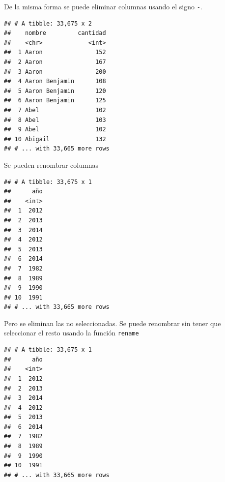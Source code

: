 \documentclass[]{book}
\newenvironment{Shaded}{\begin{snugshade}}{\end{snugshade}}
\newcommand{\DataTypeTok}[1]{\textcolor[rgb]{0.13,0.29,0.53}{#1}}
\newcommand{\KeywordTok}[1]{\textcolor[rgb]{0.13,0.29,0.53}{\textbf{#1}}}
\newcommand{\NormalTok}[1]{#1}
\newcommand{\OperatorTok}[1]{\textcolor[rgb]{0.81,0.36,0.00}{\textbf{#1}}}
\newcommand{\StringTok}[1]{\textcolor[rgb]{0.31,0.60,0.02}{#1}}
\theoremstyle{definition}
\theoremstyle{definition}
\theoremstyle{definition}
\theoremstyle{remark}
\begin{document}
De la misma forma se puede eliminar columnas usando el signo \texttt{-}.

\begin{Shaded}
\end{Shaded}

\begin{verbatim}
## # A tibble: 33,675 x 2
##    nombre         cantidad
##    <chr>             <int>
##  1 Aaron               152
##  2 Aaron               167
##  3 Aaron               200
##  4 Aaron Benjamin      108
##  5 Aaron Benjamin      120
##  6 Aaron Benjamin      125
##  7 Abel                102
##  8 Abel                103
##  9 Abel                102
## 10 Abigail             132
## # ... with 33,665 more rows
\end{verbatim}

Se pueden renombrar columnas

\begin{Shaded}
\end{Shaded}

\begin{verbatim}
## # A tibble: 33,675 x 1
##      año
##    <int>
##  1  2012
##  2  2013
##  3  2014
##  4  2012
##  5  2013
##  6  2014
##  7  1982
##  8  1989
##  9  1990
## 10  1991
## # ... with 33,665 more rows
\end{verbatim}

Pero se eliminan las no seleccionadas. Se puede renombrar sin tener que
seleccionar el resto usando la función \texttt{rename}

\begin{Shaded}
\end{Shaded}

\begin{verbatim}
## # A tibble: 33,675 x 1
##      año
##    <int>
##  1  2012
##  2  2013
##  3  2014
##  4  2012
##  5  2013
##  6  2014
##  7  1982
##  8  1989
##  9  1990
## 10  1991
## # ... with 33,665 more rows
\end{verbatim}
\end{document}
